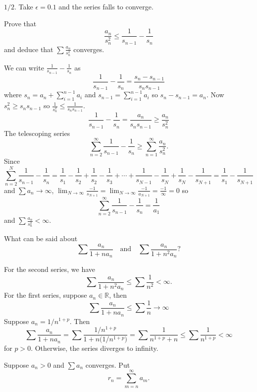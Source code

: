 \begin{exercise}
\begin{exercise}[label = (\alph*), ref = \arabic{exercisei} (\alph*)]
    \(1/2\).
    Take \(\epsilon = 0.1\) and the series falls to converge.
  \item
    Prove that
    \[
    \frac{a_n}{s_n^2}\leq\frac{1}{s_{n - 1}} - \frac{1}{s_n}
    \]
    and deduce that \(\sum\frac{a_n}{s_n^2}\) converges.
    \par\smallskip
    We can write \(\frac{1}{s_{n - 1}} - \frac{1}{s_n}\) as
    \[
    \frac{1}{s_{n - 1}} - \frac{1}{s_n} = \frac{s_n - s_{n - 1}}{s_ns_{n - 1}}
    \]
    where \(s_n = a_n + \sum_{i = 1}^{n - 1}a_i\) and
    \(s_{n - 1} = \sum_{i = 1}^{n - 1}a_i\) so \(s_n - s_{n - 1} = a_n\).
    Now \(s_n^2\geq s_ns_{n - 1}\) so
    \(\frac{1}{s_n^2}\leq\frac{1}{s_ns_{n - 1}}\).
    \[
    \frac{1}{s_{n - 1}} - \frac{1}{s_n} = \frac{a_n}{s_ns_{n - 1}}\geq
    \frac{a_n}{s_n^2}
    \]
    The telescoping series
    \[
    \sum_{n = 2}^{\infty}\frac{1}{s_{n - 1}} - \frac{1}{s_n}\geq
    \sum_{n = 1}^{\infty}\frac{a_n}{s_n^2}.
    \]
    Since
    \[
    \sum_{n = 2}^N\frac{1}{s_{n - 1}} - \frac{1}{s_n} =
    \frac{1}{s_1} - \frac{1}{s_2} + \frac{1}{s_2} - \frac{1}{s_3} + \cdots +
    \frac{1}{s_{N - 1}} - \frac{1}{s_N} + \frac{1}{s_N} - \frac{1}{s_{N + 1}}
    = \frac{1}{s_1} - \frac{1}{s_{N + 1}}
    \]
    and \(\sum a_n\to\infty\), \(\lim_{N\to\infty}\frac{-1}{s_{N + 1}} =
    \lim_{N\to\infty}\frac{-1}{a_{N + 1}} = \frac{-1}{\infty} = 0\) so
    \[
    \sum_{n = 2}^{\infty}\frac{1}{s_{n - 1}} - \frac{1}{s_n} = \frac{1}{a_1}
    \]
    and \(\sum\frac{a_n}{s_n^2} < \infty\).
  \item
    What can be said about
    \[
    \sum\frac{a_n}{1 + na_n}\quad\text{and}\quad\sum\frac{a_n}{1 + n^2a_n}
    \mbox{?}
    \]
    \par\smallskip
    For the second series, we have
    \[
    \sum\frac{a_n}{1 + n^2a_n}\leq\sum\frac{1}{n^2} < \infty.
    \]
    For the first series, suppose \(a_n\in\mathbb{R}\), then
    \[
    \sum\frac{a_n}{1 + na_n}\leq\sum\frac{1}{n}\to\infty
    \]
    Suppose \(a_n = 1/n^{1 + p}\).
    Then
    \[
    \sum\frac{a_n}{1 + na_n} =
    \sum\frac{1/n^{1 + p}}{1 + n\bigl(1/n^{1 + p}\bigr)} =
    \sum\frac{1}{n^{1 + p} + n}\leq\sum\frac{1}{n^{1 + p}} < \infty
    \]
    for \(p > 0\).
    Otherwise, the series diverges to infinity.
  \end{exercise}
\item
  Suppose \(a_n > 0\) and \(\sum a_n\) converges.
  Put
  \[
  r_n = \sum_{m = n}^{\infty}a_m.
  \]
  \begin{exercise}[label = (\alph*)]
  \item

\end{exercise}
\end{exercise}
